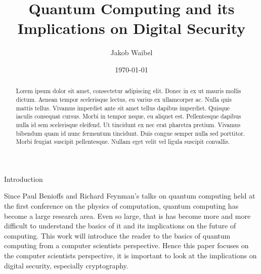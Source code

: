 \documentclass[aps,preprintnumbers,twocolumn]{revtex4}
\begin{document}
\title{Quantum Computing and its Implications on Digital Security}
\author{Jakob Waibel}


\date{\today}

\begin{abstract}
Lorem ipsum dolor sit amet, consectetur adipiscing elit. Donec in ex ut mauris mollis dictum. Aenean tempor scelerisque lectus, eu varius ex ullamcorper ac. Nulla quis mattis tellus. Vivamus imperdiet ante sit amet tellus dapibus imperdiet. Quisque iaculis consequat cursus. Morbi in tempor neque, eu aliquet est. Pellentesque dapibus nulla id sem scelerisque eleifend. Ut tincidunt ex nec erat pharetra pretium. Vivamus bibendum quam id nunc fermentum tincidunt. Duis congue semper nulla sed porttitor. Morbi feugiat suscipit pellentesque. Nullam eget velit vel ligula suscipit convallis.
\end{abstract}

\maketitle

\begin{section}{Introduction}
    
Since Paul Benioffs and Richard Feynman's talks on quantum computing held at the first conference on the physics of computation, 
quantum computing has become a large research area. 
Even so large, that is has become more and more difficult to understand the basics of it and its implications on the future of computing. 
This work will introduce the reader to the basics of quantum computing from a computer scientists perspective. 
Hence this paper focuses on the computer scientists perspective, it is important to look at the implications on digital security, especially cryptography.

\end{section}
\end{document}
